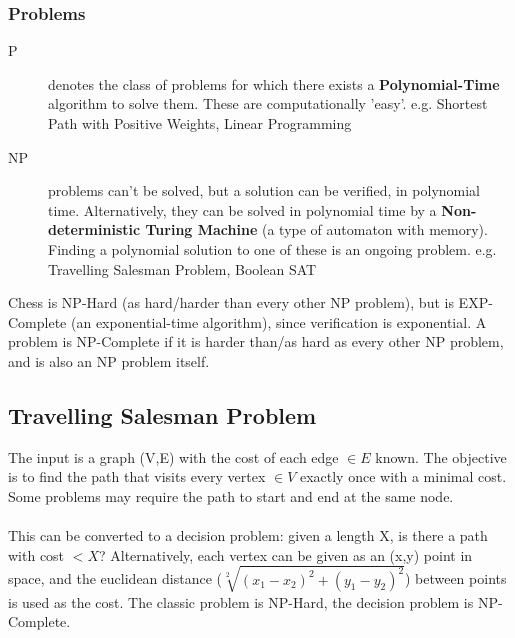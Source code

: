 \subsubsection{Problems}\label{subsec:Time_Complexity_Problems}
\begin{description}
    \item[P] denotes the class of problems for which there exists a \textbf{Polynomial-Time} algorithm to solve them. These are computationally 'easy'. e.g. Shortest Path with Positive Weights, Linear Programming
    \item[NP] problems can't be solved, but a solution can be verified, in polynomial time. Alternatively, they can be solved in polynomial time by a \textbf{Non-deterministic Turing Machine} (a type of automaton with memory). Finding a polynomial solution to one of these is an ongoing problem. e.g. Travelling Salesman Problem, Boolean SAT
\end{description}
Chess is NP-Hard (as hard/harder than every other NP problem), but is EXP-Complete (an exponential-time algorithm), since verification is exponential. A problem is NP-Complete if it is harder than/as hard as every other NP problem, and is also an NP problem itself.

\subsection{Travelling Salesman Problem}
The input is a graph (V,E) with the cost of each edge $\in E$ known. The objective is to find the path that visits every vertex $\in V$ exactly once with a minimal cost. Some problems may require the path to start and end at the same node.\\ \\
This can be converted to a decision problem: given a length X, is there a path with cost $< X$? Alternatively, each vertex can be given as an (x,y) point in space, and the euclidean distance (\(\sqrt[2]{(x_1-x_2)^2+(y_1-y_2)^2}\)) between points is used as the cost. The classic problem is NP-Hard, the decision problem is NP-Complete.

